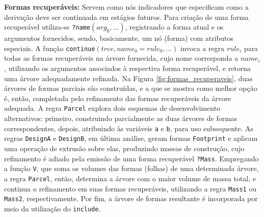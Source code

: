 \textbf{Formas recuperáveis:} Servem como nós indicadores que especificam como a derivação deve ser continuada em estágios futuros. Para criação de uma forma recuperável utiliza-se \texttt{?name}$(arg_0, ...)$, registrando a forma atual e os argumentos fornecidos, sendo, basicamente, um nó (forma) com atributos especiais. A função \texttt{continue}$(tree, name_0 = rule_0, ...)$ invoca a regra $rule_i$ para todas as formas recuperáveis na árvore fornecida, cujo nome corresponda a $name_i$, utilizando os argumentos associados à respectiva forma recuperável, e retorna uma árvore adequadamente refinada. Na Figura \ref{fig:formas_recuperaveis}, duas árvores de formas parciais são construídas, e a que se mostra como melhor opção é, então, completada pelo refinamento das formas recuperáveis da árvore adequada. A regra \texttt{Parcel} explora dois esquemas de desenvolvimento alternativos: primeiro, construindo parcialmente as duas árvores de formas correspondentes, depois, atribuindo às variáveis \texttt{a} e \texttt{b}, para uso subsequente. As regras \texttt{DesignA} e \texttt{DesignB}, em última análise, geram formas \texttt{Footprint} e aplicam uma operação de extrusão sobre elas, produzindo massas de construção, cujo refinamento é adiado pela emissão de uma forma recuperável \texttt{?Mass}. Empregando a função \texttt{V}, que soma os volumes das formas (folhas) de uma determinada árvore, a regra \texttt{Parcel}, então, determina a árvore com o maior volume de massa total, e continua o refinamento em suas formas recuperáveis, utilizando a regra \texttt{Mass1} ou \texttt{Mass2}, respectivamente. Por fim, a árvore de formas resultante é incorporada por meio da utilização do \texttt{include}.

\begin{figure}[h!]
	\centering
	\captionsetup{width=15cm}
	{}
\end{figure}

